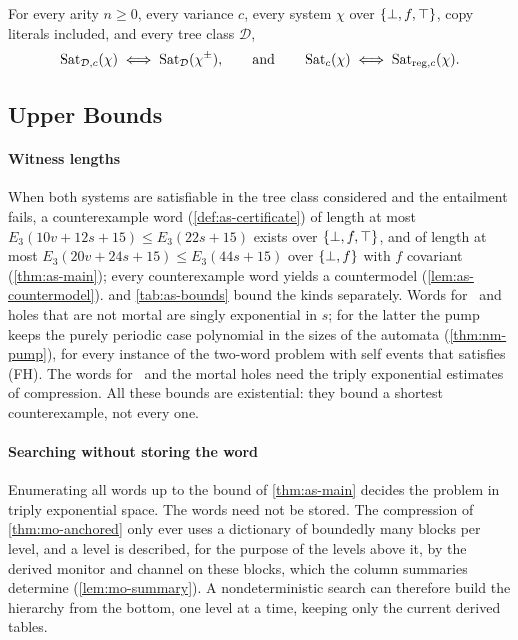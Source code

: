 \begin{lemma}\label{lem:bg-signed-sat}
For every arity $n\ge0$, every variance $c$, every system $\chi$ over $\{\bot,f,\top\}$,
copy literals included, and every tree class $\mathcal D$,
\[
 \operatorname{Sat}_{\mathcal D,c}(\chi)\iff\operatorname{Sat}_{\mathcal D}(\chi^\pm),
 \qquad\text{and}\qquad
 \operatorname{Sat}_c(\chi)\iff\operatorname{Sat}_{\mathrm{reg},c}(\chi).
\]
\end{lemma}

\subsection{Upper Bounds}\label{sec:cx-upper}

\paragraph{Witness lengths}
When both systems are satisfiable in the tree class considered and the
entailment fails, a counterexample word (\cref{def:as-certificate}) of length
at most $E_3(10v+12s+15)\le E_3(22s+15)$ exists over $\{\bot,f,\top\}$, and of length at
most $E_3(20v+24s+15)\le E_3(44s+15)$ over $\{\bot,f\}$ with $f$ covariant
(\cref{thm:as-main}); every counterexample word yields a countermodel
(\cref{lem:as-countermodel}).  and
\cref{tab:as-bounds} bound the kinds separately. Words for \CondI\ and holes
that are not mortal are singly exponential in $s$; for the latter the pump
keeps the purely periodic case polynomial in the sizes of the automata
(\cref{thm:nm-pump}), for every instance of the two-word problem with self
events that satisfies (FH). The words for \CondU\ and the mortal holes need
the triply exponential estimates of compression. All these bounds are existential: they bound a shortest
counterexample, not every one.

\paragraph{Searching without storing the word}
Enumerating all words up to the bound of \cref{thm:as-main} decides the
problem in triply exponential space. The words need not be stored. The
compression of \cref{thm:mo-anchored} only ever uses a dictionary of boundedly
many blocks per level, and a level is described, for the purpose of the
levels above it, by the derived monitor and channel on these blocks, which
the column summaries determine (\cref{lem:mo-summary}). A nondeterministic
search can therefore build the hierarchy from the bottom, one level at a time,
keeping only the current derived tables.

